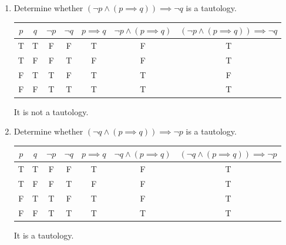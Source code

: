 \documentclass[11pt]{article}
\begin{document}
\begin{enumerate}[label=\textbf{\arabic*.}]
	\item Determine whether $(\neg p \land (p \implies q)) \implies \neg q$ is a tautology.

	\begin{tabular}{c | c | c | c | c | c | c}
		$p$ & $q$ & $\neg p$ & $\neg q$ & $p \implies q$ & $\neg p \land (p \implies q)$ & $(\neg p \land (p \implies q)) \implies \neg q$ \\
		\hline
		T & T & F & F & T & F & T \\
		T & F & F & T & F & F & T \\
		F & T & T & F & T & T & F \\
		F & F & T & T & T & T & T
	\end{tabular}

	It is not a tautology.

	\item Determine whether $(\neg q \land (p \implies q)) \implies \neg p$ is a tautology.
	
	\begin{tabular}{c | c | c | c | c | c | c}
		$p$ & $q$ & $\neg p$ & $\neg q$ & $p \implies q$ & $\neg q \land (p \implies q)$ & $(\neg q \land (p \implies q)) \implies \neg p$ \\
		\hline
		T & T & F & F & T & F & T \\
		T & F & F & T & F & F & T \\
		F & T & T & F & T & F & T \\
		F & F & T & T & T & T & T
	\end{tabular}

	It is a tautology.
\end{enumerate}
\end{document}
